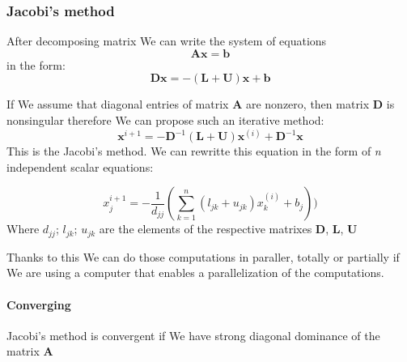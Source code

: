 \documentclass[12pt]{report}
\begin{document}
\subsubsection{Jacobi's method}
After decomposing matrix We can write the system of equations
\[ \mathbf{A}\mathbf{x} = \mathbf{b} \]
in the form:
\[ \mathbf{D}\mathbf{x} = -(\mathbf{L}+\mathbf{U})\mathbf{x}+\mathbf{b}
\]

If We assume that diagonal entries of matrix \textbf{A} are nonzero, then matrix \textbf{D} is nonsingular therefore We can propose such an iterative method:
\[ \mathbf{x}^{i+1} = -\mathbf{D}^{-1}(\mathbf{L}+\mathbf{U})\mathbf{x}^{(i)}+\mathbf{D}^{-1}\mathbf{x}
\]
This is the Jacobi's method.
We can rewritte this equation in the form of \textit{n} independent scalar equations:

\[
{x}_j^{i+1} = -\frac{1}{d_{jj}}(
\sum^n_{k=1} (l_{jk} + u_{jk})x_k^{(i)}+b_j)
) \]
Where $d_{jj}$; $l_{jk}$;  $u_{jk}$ are the elements of the respective matrixes \textbf{D}, \textbf{L}, \textbf{U}

Thanks to this We can do those computations in paraller, totally or partially if We are using a computer that enables a parallelization of the computations.

\paragraph{Converging}
Jacobi's method is convergent if We have strong diagonal dominance of the matrix \textbf{A}
\end{document}
